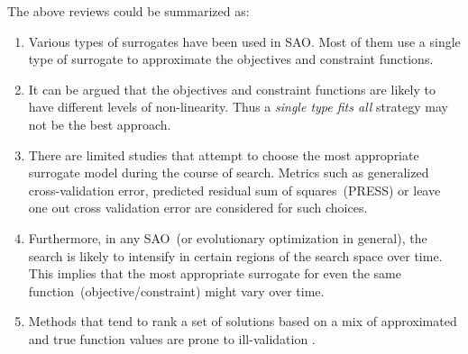 The above reviews could be summarized as:
\begin{enumerate}
	\item Various types of surrogates have been used in SAO. Most of them use a single type of surrogate to approximate the objectives and constraint functions.
	\item It can be argued that the objectives and constraint functions are likely to have different levels of non-linearity. Thus a \textit{single type fits all} strategy may not be the best approach. 
	\item There are limited studies that attempt to choose the most appropriate surrogate model during the course of search. Metrics such as generalized cross-validation error, predicted residual sum of squares~(PRESS) \cite{goel_ensemble_2007} or leave one out cross validation error \cite{Zhang2012uncertainty} are considered for such choices. 
	\item Furthermore, in any SAO~(or evolutionary optimization in general), the search is likely to intensify in certain regions of the search space over time. This implies that the most appropriate surrogate for even the same function~(objective/constraint) might vary over time.
	\item Methods that tend to rank a set of solutions based on a mix of approximated and true function values are prone to ill-validation \cite{jin2005csf}. 
	
\end{enumerate}

